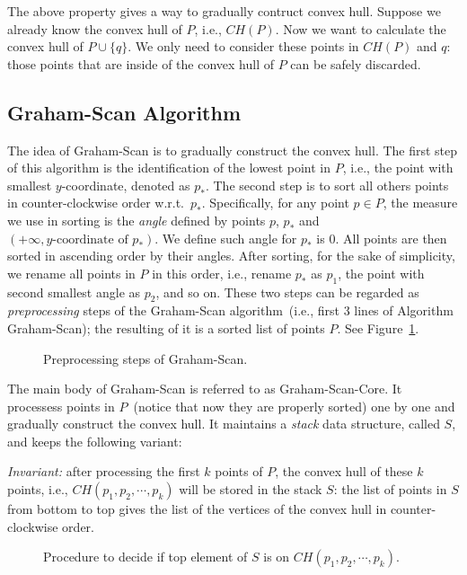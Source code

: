The above property gives a way to gradually contruct convex hull.
Suppose we already know the convex hull of $P$, i.e., $CH(P)$. Now we want to calculate
the convex hull of $P\cup\{q\}$. We only need to consider these points in $CH(P)$ and $q$:
those points that are inside of the convex hull of $P$ can be safely discarded.

\subsection*{Graham-Scan Algorithm}

The idea of Graham-Scan is to gradually construct the convex hull.
The first step of this algorithm is the identification of the lowest point in $P$, i.e., the point with smallest $y$-coordinate, denoted as $p_*$.
The second step is to sort all others points in counter-clockwise order w.r.t.\ $p_*$.
Specifically, for any point $p\in P$, the measure we use in sorting is the \emph{angle} defined by points $p$, $p_*$ and $(+\infty, \textrm{$y$-coordinate of $p_*$})$.
We define such angle for $p_*$ is 0. All points are then sorted in ascending order by their angles.
After sorting, for the sake of simplicity, we rename all points in $P$ in this order, i.e., 
rename $p_*$ as $p_1$, the point with second smallest angle as $p_2$, and so on.
These two steps can be regarded as \emph{preprocessing} steps of the Graham-Scan algorithm~(i.e., first 3 lines of Algorithm Graham-Scan);
the resulting of it is a sorted list of points $P$.
See Figure~\ref{fig:sorting}.


\begin{figure}[h!]
\centering{}
\caption{Preprocessing steps of Graham-Scan.}
\label{fig:sorting}
\end{figure}


The main body of Graham-Scan is referred to as Graham-Scan-Core.
It processess points in $P$~(notice that now they are properly sorted) one by one
and gradually construct the convex hull.
It maintains a \emph{stack} data structure, called $S$, and keeps the following variant:

\emph{Invariant:} after processing the first $k$ points of $P$, the convex hull
of these $k$ points, i.e., $CH(p_1, p_2, \cdots, p_k)$ will be stored in the stack $S$: the list of points in $S$
from bottom to top gives the list of the vertices of the convex hull in
counter-clockwise order.

\begin{figure}[b!]
\centering{}
\caption{Procedure to decide if top element of $S$ is on $CH(p_1, p_2, \cdots, p_k)$.}
\label{fig:invariant}
\end{figure}


